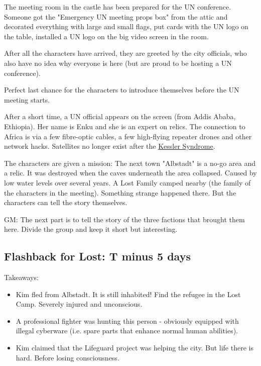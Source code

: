 The meeting room in the castle has been prepared for the UN conference. Someone got the "Emergency UN meeting props box" from the attic and decorated everything with large and small flags, put cards with the UN logo on the table, installed a UN logo on the big video screen in the room.

After all the characters have arrived, they are greeted by the city officials, who also have no idea why everyone is here (but are proud to be hosting a UN conference).

Perfect last chance for the characters to introduce themselves before the UN meeting starts.

After a short time, a UN official appears on the screen (from Addis Ababa, Ethiopia). Her name is Enku and she is an expert on relics.
The connection to Africa is via a few fibre-optic cables, a few high-flying repeater drones and other network hacks. Satellites no longer exist after the \hyperref[sec: Kessler Syndrome]{Kessler Syndrome}.

The characters are given a mission:
The next town "Albstadt" is a no-go area and a relic. It was destroyed when the caves underneath the area collapsed. Caused by low water levels over several years. A Lost Family camped nearby (the family of the characters in the meeting). Something strange happened there. But the characters can tell the story themselves.

GM: The next part is to tell the story of the three factions that brought them here. Divide the group and keep it short but interesting.

\subsection{Flashback for Lost: T minus 5 days}

Takeaways:

\begin{itemize}
    \item Kim fled from Albstadt. It is still inhabited! Find the refugee in the Lost Camp. Severely injured and unconscious.
    \item A professional fighter was hunting this person - obviously equipped with illegal cyberware (i.e. spare parts that enhance normal human abilities).
    \item Kim claimed that the Lifeguard project was helping the city. But life there is hard. Before losing consciousness.
\end{itemize}


